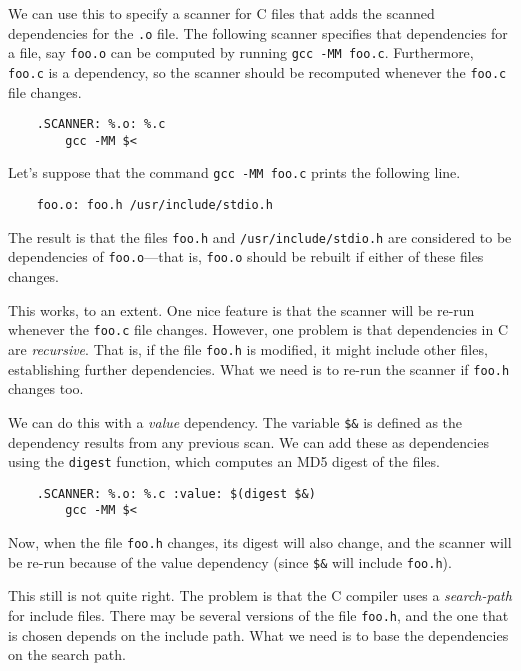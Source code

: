 We can use this to specify a scanner for C files that adds the scanned dependencies for the
\verb+.o+ file.  The following scanner specifies that dependencies for a file, say \verb+foo.o+ can
be computed by running \verb+gcc -MM foo.c+.  Furthermore, \verb+foo.c+ is a dependency, so the
scanner should be recomputed whenever the \verb+foo.c+ file changes.

\begin{verbatim}
    .SCANNER: %.o: %.c
        gcc -MM $<
\end{verbatim}

Let's suppose that the command \verb+gcc -MM foo.c+ prints the following line.

\begin{verbatim}
    foo.o: foo.h /usr/include/stdio.h
\end{verbatim}

The result is that the files \verb+foo.h+ and \verb+/usr/include/stdio.h+ are considered to be
dependencies of \verb+foo.o+---that is, \verb+foo.o+ should be rebuilt if either of these files
changes.

This works, to an extent.  One nice feature is that the scanner will be re-run whenever the
\verb+foo.c+ file changes.  However, one problem is that dependencies in C are \emph{recursive}.
That is, if the file \verb+foo.h+ is modified, it might include other files, establishing further
dependencies.  What we need is to re-run the scanner if \verb+foo.h+ changes too.

We can do this with a \emph{value} dependency.  The variable \verb+$&+ is defined as the dependency
results from any previous scan.  We can add these as dependencies using the \verb+digest+ function,
which computes an MD5 digest of the files.

\begin{verbatim}
    .SCANNER: %.o: %.c :value: $(digest $&)
        gcc -MM $<
\end{verbatim}

Now, when the file \verb+foo.h+ changes, its digest will also change, and the scanner will be re-run
because of the value dependency (since \verb+$&+ will include \verb+foo.h+).

This still is not quite right.  The problem is that the C compiler uses a \emph{search-path} for
include files.  There may be several versions of the file \verb+foo.h+, and the one that is chosen
depends on the include path.  What we need is to base the dependencies on the search path.

